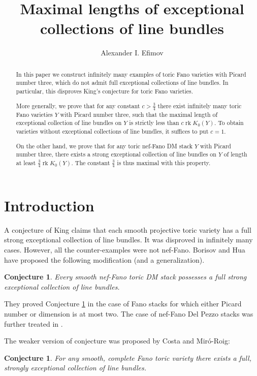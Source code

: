 \documentclass[11pt,leqno]{amsart}
\title[Maximal lengths of exceptional collections of line bundles]
{Maximal lengths of exceptional collections of line bundles}
\author{Alexander I. Efimov}
\newtheorem{conj}[theo]{Conjecture}
\numberwithin{equation}{section}
\newcommand{\rk}{\operatorname{rk}}
\begin{document}
\begin{abstract} In this paper we construct infinitely many examples of toric Fano varieties with Picard number three, which do not admit full exceptional collections of line bundles. In particular, this disproves King's conjecture for toric Fano varieties.

More generally, we prove that for any constant $c>\frac34$ there exist infinitely many toric Fano varieties $Y$ with Picard number three,
such that the maximal length of exceptional collection of line bundles on $Y$ is strictly less than $c\rk K_0(Y).$ To obtain varieties without exceptional collections of line bundles,
it suffices to put $c=1.$

On the other hand, we prove that for any toric nef-Fano DM stack $Y$ with Picard number three, there exists a strong exceptional collection of line bundles on $Y$
of length at least $\frac34 \rk K_0(Y).$ The constant $\frac34$ is thus maximal with this property.
\end{abstract}

\maketitle


\section{Introduction}

A conjecture of King \cite{Ki} claims that each smooth projective toric variety has a full strong exceptional collection of line bundles.
It was disproved \cite{HP1, HP2, Mi} in infinitely many cases. However, all the counter-examples were not nef-Fano. Borisov and Hua
have proposed the following modification (and a generalization).

\begin{conj}\label{Borisov_Hua}Every smooth nef-Fano toric DM stack possesses a
full strong exceptional collection of line bundles.\end{conj}

They proved Conjecture \ref{Borisov_Hua} \cite{BH} in the case of Fano stacks for which either Picard number or dimension is at most two.
The case of nef-Fano Del Pezzo stacks was further treated in \cite{IU}.

The weaker version of conjecture was proposed by Costa and Mir\'o-Roig:

\begin{conj}\label{Miro-Roig}For any smooth, complete Fano toric variety there exists
a full, strongly exceptional collection of line bundles.\end{conj}
\end{document}
